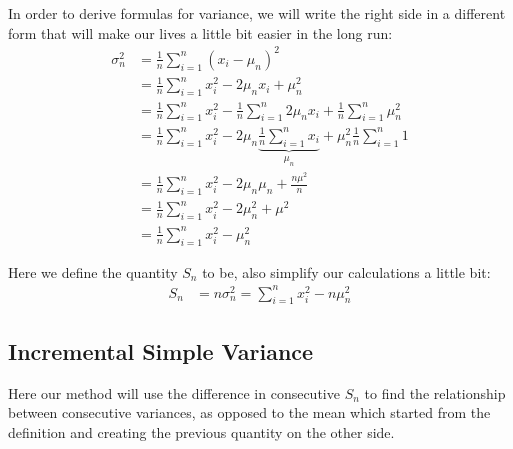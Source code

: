 \documentclass[english,12pt]{article}
\theoremstyle{plain}
\theoremstyle{definition}
\theoremstyle{definition} %
\begin{document}
In order to derive formulas for variance, we will write the right side in a different form that will make our lives a little bit easier in the long run:
\begin{align*}
\sigma_n^2 &= \frac{1}{n}\sum_{i=1}^n (x_i - \mu_n)^2\\
&=\frac{1}{n}\sum_{i=1}^n x_i^2 - 2\mu_nx_i + \mu_n^2\\
&=\frac{1}{n}\sum_{i=1}^n x_i^2 - \frac{1}{n}\sum_{i=1}^n2\mu_nx_i + \frac{1}{n}\sum_{i=1}^n \mu_n^2\\
&=\frac{1}{n}\sum_{i=1}^n x_i^2 - 2\mu_n\underbrace{\frac{1}{n}\sum_{i=1}^nx_i}_{\mu_n} + \mu_n^2\frac{1}{n}\sum_{i=1}^n 1\\
&=\frac{1}{n}\sum_{i=1}^n x_i^2 - 2\mu_n\mu_n + \frac{n\mu^2}{n}\\
&=\frac{1}{n}\sum_{i=1}^n x_i^2 - 2\mu_n^2 + \mu^2\\
&=\frac{1}{n}\sum_{i=1}^n x_i^2 - \mu_n^2
\end{align*}

Here we define the quantity $S_n$ to be, also simplify our calculations a little bit:
\begin{align*}
S_n &= n\sigma_n^2
= \sum_{i=1}^n x_i^2 - n\mu_n^2
\end{align*}

\subsection{Incremental Simple Variance}
Here our method will use the difference in consecutive $S_n$ to find the relationship between consecutive variances, as opposed to the mean which started from the definition and creating the previous quantity on the other side.
\end{document}
